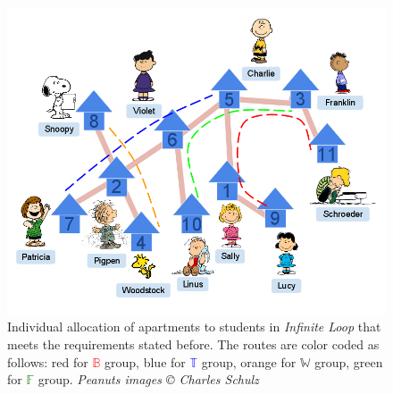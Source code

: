 \documentclass[MS,synopsis]{iitmdiss}
\def \figtabsize {\footnotesize}
\def \xLLL {\mathbb{B}}
\def \xGGG {\mathbb{T}}
\def \xBBB {\mathbb{W}}
\def \xTTT {\mathbb{F}}
\def \residenceblock {{\em Infinite Loop}}
\begin{document}
\begin{figure}[htbp] %
  \centering
  \includegraphics[scale=0.3]{../img/3_infinite_loop.png}
  \caption{\figtabsize Individual allocation of apartments to students
    in {\residenceblock} that meets the requirements stated before.
    The routes are color coded as follows: red for
    \textcolor{red}{$\xLLL$} group, blue for \textcolor{blue}{$\xGGG$}
    group, orange for \textcolor{YellowOrange}{$\xBBB$} group, green
    for \textcolor{green}{$\xTTT$} group. {\tiny {\em Peanuts images {\copyright} Charles
    Schulz}}}
  \label{fig:streetmappathpeople}
\end{figure}
\end{document}
